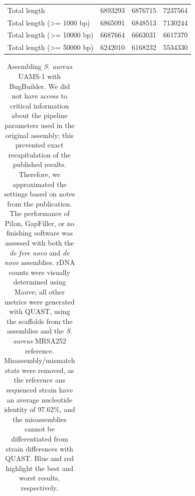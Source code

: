 \documentclass[10pt]{article}
\begin{document}
\begin{table}[]
\begin{tabular}{lrrr}
Total length & 6893293 & \cellcolor[HTML]{FBDADA}6876715 & \cellcolor[HTML]{CDCDF9}7237564 \\
Total length (\textgreater= 1000 bp) & 6865091 & \cellcolor[HTML]{FBDADA}6848513 & \cellcolor[HTML]{CDCDF9}7130244 \\
Total length (\textgreater= 10000 bp) & \cellcolor[HTML]{CDCDF9}6687664 & 6663031 & \cellcolor[HTML]{FBDADA}6617370 \\
Total length (\textgreater= 50000 bp) & \cellcolor[HTML]{CDCDF9}6242010 & 6168232 & \cellcolor[HTML]{FBDADA}5534330
\end{tabular}
\end{table}


\begin{table}[ht]
\begin{center}
  \caption{Assembling \textit{S. aureus} UAMS-1 with BugBuilder. We did not have access to critical information about the pipeline parameters used in the original assembly; this prevented exact recapitulation of the published results. Therefore, we approximated the settings based on notes from the publication. The performance of Pilon\cite{Walker2014a}, GapFiller\cite{Boetzer2012}, or no finishing software was assessed with both the \textit{de fere novo} and \textit{de novo} assemblies. rDNA counts were visually determined using Mauve; all other metrics were generated with QUAST, using the scaffolds from the assemblies and the \textit{S. aureus} MRSA252 reference. Misassembly/mismatch stats were removed, as the reference ans sequenced strain have an average nucleotide identity of 97.62\%, and the misassemblies cannot be differentiated from strain differences with QUAST. Blue and red highlight the best and worst results, respectively.}
\begin{tabular}{lrrr|rrr}


\end{tabular}
\end{center}
\end{table}
\end{document}
